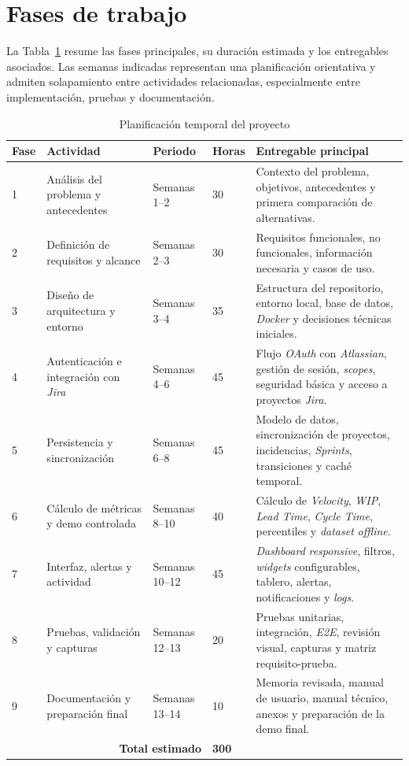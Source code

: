 \section{Fases de trabajo}

La Tabla~\ref{tab:planificacion-fases} resume las fases principales, su duración estimada y los entregables asociados. Las semanas indicadas representan una planificación orientativa y admiten solapamiento entre actividades relacionadas, especialmente entre implementación, pruebas y documentación.

\begin{table}[htbp]
\centering
\small
\setlength{\tabcolsep}{4pt}
\renewcommand{\arraystretch}{1.18}
\begin{tabularx}{\textwidth}{p{1.2cm}p{3.2cm}p{2.4cm}p{1.8cm}X}
\toprule
\textbf{Fase} & \textbf{Actividad} & \textbf{Periodo} & \textbf{Horas} & \textbf{Entregable principal} \\
\midrule
1 & Análisis del problema y antecedentes & Semanas 1--2 & 30 & Contexto del problema, objetivos, antecedentes y primera comparación de alternativas. \\
2 & Definición de requisitos y alcance & Semanas 2--3 & 30 & Requisitos funcionales, no funcionales, información necesaria y casos de uso. \\
3 & Diseño de arquitectura y entorno & Semanas 3--4 & 35 & Estructura del repositorio, entorno local, base de datos, \textit{Docker} y decisiones técnicas iniciales. \\
4 & Autenticación e integración con \textit{Jira} & Semanas 4--6 & 45 & Flujo \textit{OAuth} con \textit{Atlassian}, gestión de sesión, \textit{scopes}, seguridad básica y acceso a proyectos \textit{Jira}. \\
5 & Persistencia y sincronización & Semanas 6--8 & 45 & Modelo de datos, sincronización de proyectos, incidencias, \textit{Sprints}, transiciones y caché temporal. \\
6 & Cálculo de métricas y demo controlada & Semanas 8--10 & 40 & Cálculo de \textit{Velocity}, \textit{WIP}, \textit{Lead Time}, \textit{Cycle Time}, percentiles y \textit{dataset} \textit{offline}. \\
7 & Interfaz, alertas y actividad & Semanas 10--12 & 45 & \textit{Dashboard} \textit{responsive}, filtros, \textit{widgets} configurables, tablero, alertas, notificaciones y \textit{logs}. \\
8 & Pruebas, validación y capturas & Semanas 12--13 & 20 & Pruebas unitarias, integración, \textit{E2E}, revisión visual, capturas y matriz requisito-prueba. \\
9 & Documentación y preparación final & Semanas 13--14 & 10 & Memoria revisada, manual de usuario, manual técnico, anexos y preparación de la demo final. \\
\midrule
\multicolumn{3}{r}{\textbf{Total estimado}} & \textbf{300} & \\
\bottomrule
\end{tabularx}
\caption{Planificación temporal del proyecto}
\label{tab:planificacion-fases}
\end{table}

